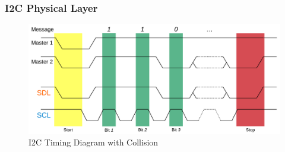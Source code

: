 \documentclass{beamer}
\newcommand{\paragraph}[1]{\vspace{6pt}\textbf{#1}}
\begin{document}
\begin{frame}
  \frametitle{I2C Physical Layer}
  
  \begin{figure}[H]
    \includegraphics[width=.95\textwidth]{images/i2c-collision.pdf}
    \caption{I2C Timing Diagram with Collision}
  \end{figure}

\end{frame}

  
\end{document}
